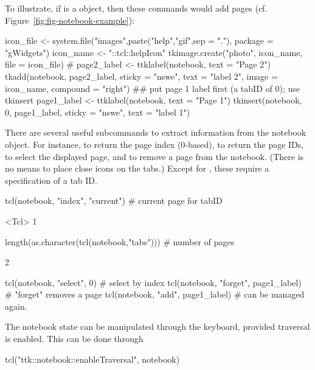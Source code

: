 To illustrate, if  is a  object, then these
commands would add pages (cf. Figure~\ref{fig:fig-notebook-example}):
\begin{Schunk}
\begin{Sinput}
 icon_file <- system.file("images",paste("help","gif",sep = "."),
                         package = "gWidgets")
 icon_name <- "::tcl::helpIcon"
 tkimage.create("photo", icon_name, file = icon_file)
 #
 page2_label <- ttklabel(notebook, text = "Page 2")
 tkadd(notebook, page2_label, sticky = "nswe", text = "label 2", 
     image = icon_name, compound = "right")
 ## put page 1 label first (a tabID of 0); use tkinsert
 page1_label <- ttklabel(notebook, text = "Page 1")
 tkinsert(notebook, 0, page1_label, sticky = "nswe", 
          text = "label 1")
\end{Sinput}
\end{Schunk}
%
There are several useful subcommands to extract information from the
notebook object.  For instance,  to return the page index
(0-based),  to return the page IDs,  to select
the displayed page, and  to remove a page from the
notebook. (There is no means to place close icons on the tabs.)
Except for , these require a specification of a tab ID.
\begin{Schunk}
\begin{Sinput}
 tcl(notebook, "index", "current")    # current page for tabID
\end{Sinput}
\begin{Soutput}
<Tcl> 1 
\end{Soutput}
\begin{Sinput}
 length(as.character(tcl(notebook,"tabs")))  # number of pages
\end{Sinput}
\begin{Soutput}
[1] 2
\end{Soutput}
\begin{Sinput}
 tcl(notebook, "select", 0)           # select by index
 tcl(notebook, "forget", page1_label) # "forget" removes a page
 tcl(notebook, "add", page1_label)    # can be managed again.
\end{Sinput}
\end{Schunk}
%

The notebook state can be manipulated through the keyboard, provided traversal is enabled. This can be done through
\begin{Schunk}
\begin{Sinput}
 tcl("ttk::notebook::enableTraversal", notebook)
\end{Sinput}
\end{Schunk}

